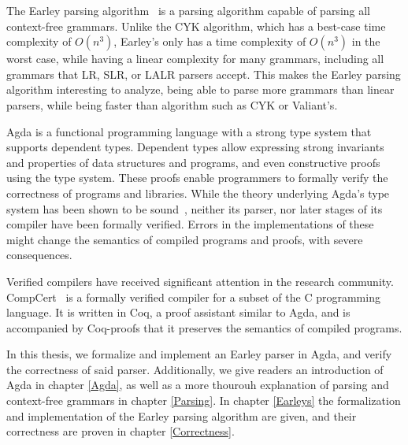 	The Earley parsing algorithm~\cite{Earley} is a parsing algorithm capable
	of parsing all context-free grammars. Unlike the CYK algorithm, which has a
	best-case time complexity of $O(n^3)$, Earley's only has a time complexity
	of $O(n^3)$ in the worst case, while having a linear complexity for many
	grammars, including all grammars that LR, SLR, or LALR parsers accept. This
	makes the Earley parsing algorithm interesting to analyze, being able to
	parse more grammars than linear parsers, while being faster than algorithm
	such as CYK or Valiant's.

	Agda is a functional programming language with a strong type system that
	supports dependent types. Dependent types allow expressing strong
	invariants and properties of data structures and programs, and even
	constructive proofs using the type system. These proofs enable programmers
	to formally verify the correctness of programs and libraries. While the
	theory underlying Agda's type system has been shown to be sound~\cite{?},
	neither its parser, nor later stages of its compiler have been formally
	verified. Errors in the implementations of these might change the semantics
	of compiled programs and proofs, with severe consequences.

	Verified compilers have received significant attention in the research
	community. CompCert~\cite{Leroy} is a formally verified compiler for a
	subset of the C programming language. It is written in Coq, a proof
	assistant similar to Agda, and is accompanied by Coq-proofs that it
	preserves the semantics of compiled programs.

	In this thesis, we formalize and implement an Earley parser in Agda, and
	verify the correctness of said parser. Additionally, we give readers an
	introduction of Agda in chapter \ref{Agda}, as well as a more thourouh
	explanation of parsing and context-free grammars in chapter \ref{Parsing}.
	In chapter \ref{Earleys} the formalization and implementation of the Earley
	parsing algorithm are given, and their correctness are proven in chapter
	\ref{Correctness}.
